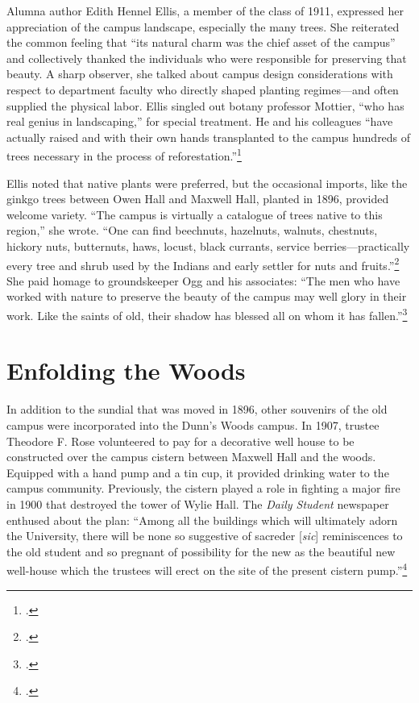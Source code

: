 \documentclass[
  american,
  letterpaper,
]{scrreprt}
\newcounter{none} %
\begin{document}
Alumna author Edith Hennel Ellis, a member of the class of 1911,
expressed her appreciation of the campus landscape, especially the many
trees. She reiterated the common feeling that ``its natural charm was
the chief asset of the campus'' and collectively thanked the individuals
who were responsible for preserving that beauty. A sharp observer, she
talked about campus design considerations with respect to department
faculty who directly shaped planting regimes---and often supplied the
physical labor. Ellis singled out botany professor Mottier, ``who has
real genius in landscaping,'' for special treatment. He and his
colleagues ``have actually raised and with their own hands transplanted
to the campus hundreds of trees necessary in the process of
reforestation.''\footnote{.}

Ellis noted that native plants were preferred, but the occasional
imports, like the ginkgo trees between Owen Hall and Maxwell Hall,
planted in 1896, provided welcome variety. ``The campus is virtually a
catalogue of trees native to this region,'' she wrote. ``One can find
beechnuts, hazelnuts, walnuts, chestnuts, hickory nuts, butternuts,
haws, locust, black currants, service berries---practically every tree
and shrub used by the Indians and early settler for nuts and
fruits.''\footnote{.} She paid
homage to groundskeeper Ogg and his associates: ``The men who have
worked with nature to preserve the beauty of the campus may well glory
in their work. Like the saints of old, their shadow has blessed all on
whom it has fallen.''\footnote{.}

\section{Enfolding the Woods}\label{enfolding-the-woods}

In addition to the sundial that was moved in 1896, other souvenirs of
the old campus were incorporated into the Dunn's Woods campus. In 1907,
trustee Theodore F. Rose volunteered to pay for a decorative well house
to be constructed over the campus cistern between Maxwell Hall and the
woods. Equipped with a hand pump and a tin cup, it provided drinking
water to the campus community. Previously, the cistern played a role in
fighting a major fire in 1900 that destroyed the tower of Wylie Hall.
The \emph{Daily Student} newspaper enthused about the plan: ``Among all
the buildings which will ultimately adorn the University, there will be
none so suggestive of sacreder {[}\emph{sic}{]} reminiscences to the old
student and so pregnant of possibility for the new as the beautiful new
well-house which the trustees will erect on the site of the present
cistern pump.''\footnote{.}
\end{document}

